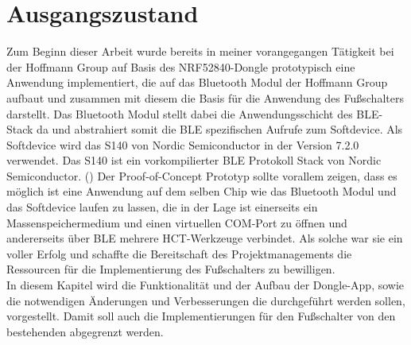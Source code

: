 \section{Ausgangszustand}
\label{Ausgangszustand}
Zum Beginn dieser Arbeit wurde bereits in meiner vorangegangen Tätigkeit bei der Hoffmann Group auf Basis des NRF52840-Dongle prototypisch eine Anwendung implementiert, die auf das Bluetooth Modul der Hoffmann Group aufbaut und zusammen mit diesem die Basis für die Anwendung des Fußschalters darstellt. Das Bluetooth Modul stellt dabei die Anwendungsschicht des \ac{BLE}-Stack da und abstrahiert somit die \ac{BLE} spezifischen Aufrufe zum Softdevice. Als Softdevice wird das S140 von Nordic Semiconductor in der Version 7.2.0 verwendet. Das S140 ist ein vorkompilierter BLE Protokoll Stack von Nordic Semiconductor. (\cite{NRF_Softdevice}) Der Proof-of-Concept Prototyp sollte vorallem zeigen, dass es möglich ist eine Anwendung auf dem selben Chip wie das Bluetooth Modul und das Softdevice laufen zu lassen, die in der Lage ist einerseits ein Massenspeichermedium und einen virtuellen COM-Port zu öffnen und andererseits über \ac{BLE} mehrere \ac{HCT}-Werkzeuge verbindet. Als solche war sie ein voller Erfolg und schaffte die Bereitschaft des Projektmanagements die Ressourcen für die Implementierung des Fußschalters zu bewilligen.\\
In diesem Kapitel wird die Funktionalität und der Aufbau der Dongle-App, sowie die notwendigen Änderungen und Verbesserungen die durchgeführt werden sollen, vorgestellt. Damit soll auch die Implementierungen für den Fußschalter von den bestehenden abgegrenzt werden.

